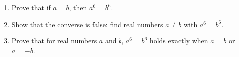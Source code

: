 \begin{enumerate}
\item[(a)] Prove that if $a=b$, then $a^6=b^6$.
\item[(b)] Show that the converse is false: find real numbers $a\ne b$ with $a^6=b^6$.
\item[(c)] Prove that for real numbers $a$ and $b$, $a^6=b^6$ holds exactly when $a=b$ or $a=-b$.
\end{enumerate}
